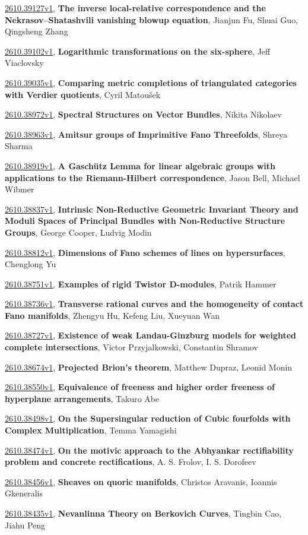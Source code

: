 \documentclass[9pt, a4paper]{article}
\theoremstyle{plain}
\theoremstyle{definition}
\theoremstyle{remark}
\newcommand{\arxiv}[3]{\href{https://arxiv.org/abs/#1}{#1}, \textbf{\textcolor{arxivblue}{#2}}, #3}
\begin{document}
\arxiv{2610.39127v1}{The inverse local-relative correspondence and the Nekrasov--Shatashvili vanishing blowup equation}{Jianjun Fu, Shuai Guo, Qingsheng Zhang}

\arxiv{2610.39102v1}{Logarithmic transformations on the six-sphere}{Jeff Viaclovsky}

\arxiv{2610.39035v1}{Comparing metric completions of triangulated categories with Verdier quotients}{Cyril Matoušek}

\arxiv{2610.38972v1}{Spectral Structures on Vector Bundles}{Nikita Nikolaev}

\arxiv{2610.38963v1}{Amitsur groups of Imprimitive Fano Threefolds}{Shreya Sharma}

\arxiv{2610.38919v1}{A Gaschütz Lemma for linear algebraic groups with applications to the Riemann-Hilbert correspondence}{Jason Bell, Michael Wibmer}

\arxiv{2610.38837v1}{Intrinsic Non-Reductive Geometric Invariant Theory and Moduli Spaces of Principal Bundles with Non-Reductive Structure Groups}{George Cooper, Ludvig Modin}

\arxiv{2610.38812v1}{Dimensions of Fano schemes of lines on hypersurfaces}{Chenglong Yu}

\arxiv{2610.38751v1}{Examples of rigid Twistor D-modules}{Patrik Hammer}

\arxiv{2610.38736v1}{Transverse rational curves and the homogeneity of contact Fano manifolds}{Zhengyu Hu, Kefeng Liu, Xueyuan Wan}

\arxiv{2610.38727v1}{Existence of weak Landau-Ginzburg models for weighted complete intersections}{Victor Przyjalkowski, Constantin Shramov}

\arxiv{2610.38674v1}{Projected Brion's theorem}{Matthew Dupraz, Leonid Monin}

\arxiv{2610.38550v1}{Equivalence of freeness and higher order freeness of hyperplane arrangements}{Takuro Abe}

\arxiv{2610.38498v1}{On the Supersingular reduction of Cubic fourfolds with Complex Multiplication}{Temma Yamagishi}

\arxiv{2610.38474v1}{On the motivic approach to the Abhyankar rectifiability problem and concrete rectifications}{A. S. Frolov, I. S. Dorofeev}

\arxiv{2610.38456v1}{Sheaves on quoric manifolds}{Christos Aravanis, Ioannis Gkeneralis}

\arxiv{2610.38435v1}{Nevanlinna Theory on Berkovich Curves}{Tingbin Cao, Jiahu Peng}
\end{document}
